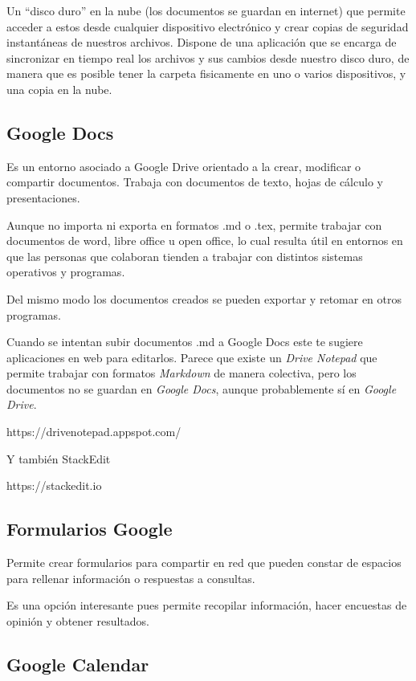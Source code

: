 \documentclass{article}
\begin{document}
Un “disco duro” en la nube (los documentos se guardan en internet) que permite acceder a estos desde cualquier
dispositivo electrónico y crear copias de seguridad instantáneas de nuestros archivos. Dispone de una aplicación que se
encarga de sincronizar en tiempo real los archivos y sus cambios desde nuestro disco duro, de manera que es posible
tener la carpeta fisicamente en uno o varios dispositivos, y una copia en la nube. 

\subsection{Google Docs}

Es un entorno asociado a Google Drive orientado a la crear, modificar o compartir documentos. Trabaja con documentos de
texto, hojas de cálculo y presentaciones. 

Aunque no importa ni exporta en formatos .md o .tex, permite trabajar con documentos de word, libre office u open
office, lo cual resulta útil en entornos en que las personas que colaboran tienden a trabajar con distintos sistemas
operativos y programas. 

Del mismo modo los documentos creados se pueden exportar y retomar en otros programas. 

Cuando se intentan subir documentos .md a Google Docs este te sugiere aplicaciones en web para editarlos. Parece que
existe un \textit{Drive Notepad} que permite trabajar con formatos \textit{Markdown} de manera colectiva, pero los documentos no se
guardan en \textit{Google Docs}, aunque probablemente sí en \textit{Google Drive}. 

https://drivenotepad.appspot.com/

Y también StackEdit

https://stackedit.io

\subsection{Formularios Google}

Permite crear formularios para compartir en red que pueden constar de espacios para rellenar información o respuestas a
consultas. 

Es una opción interesante pues permite recopilar información, hacer encuestas de opinión y obtener resultados. 

\subsection{Google Calendar}
\end{document}
